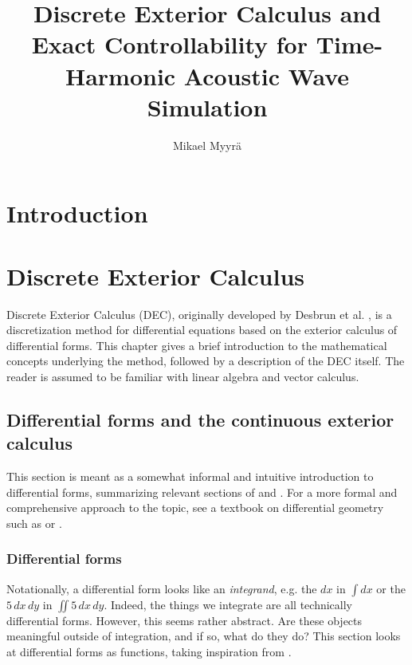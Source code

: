 \documentclass[utf8,english]{gradu3}
\title{Discrete Exterior Calculus and Exact Controllability for Time-Harmonic Acoustic Wave Simulation}
\author{Mikael Myyrä}
\begin{document}
\maketitle

\hfuzz=1.5pt
\mainmatter
\hfuzz=0pt


\chapter{Introduction}




\chapter{Discrete Exterior Calculus}

Discrete Exterior Calculus (DEC),
originally developed by Desbrun et al. \parencite*{desbrun_discrete_2005},
is a discretization method for differential equations
based on the exterior calculus of differential forms.
This chapter gives a brief introduction to the mathematical concepts
underlying the method, followed by a description of the DEC itself.
The reader is assumed to be familiar with linear algebra and vector calculus.


\section{Differential forms and the continuous exterior calculus}

This section is meant as a somewhat informal and intuitive introduction
to differential forms, summarizing relevant sections of
\parencite{blair_perot_differential_2014} and \parencite{crane_digital_2013}.
For a more formal and comprehensive approach to the topic,
see a textbook on differential geometry such as \parencite{lee_introduction_2012}
or \parencite{abraham_manifolds_2012}.


\subsection{Differential forms}

Notationally, a differential form looks like an \textit{integrand},
e.g. the $dx$ in $\int dx$ or the $5\,dx\,dy$ in $\iint 5\,dx\,dy$.
Indeed, the things we integrate are all technically differential forms.
However, this seems rather abstract.
Are these objects meaningful outside of integration,
and if so, what do they do?
This section looks at differential forms as functions,
taking inspiration from \parencite{crane_digital_2013}.
\end{document}
